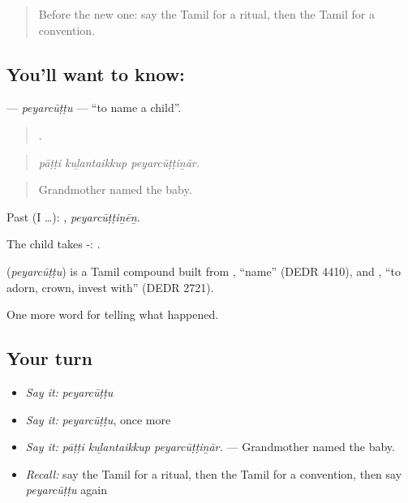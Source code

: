 \label{lesson:TA-C321-peyarcuttu}



\begin{quote}
Before the new one: say the Tamil for a ritual, then the Tamil for a convention.
\end{quote}

\subsection*{You'll want to know: }
\textbf{} — \emph{peyarcūṭṭu} — \textquotedblleft{}to name a child\textquotedblright{}.

\begin{quote}
  .
\end{quote}

\begin{quote}
\emph{pāṭṭi kuḻantaikkup peyarcūṭṭiṉār.}
\end{quote}

\begin{quote}
Grandmother named the baby.
\end{quote}

Past (I …): , \emph{peyarcūṭṭiṉēṉ}.

The child takes -:  .

\begin{cousinweb}
\textbf{} (\emph{peyarcūṭṭu}) is a Tamil compound built from , \textquotedblleft{}name\textquotedblright{} (DEDR 4410), and , \textquotedblleft{}to adorn, crown, invest with\textquotedblright{} (DEDR 2721).
\end{cousinweb}

\begin{grammarlens}[title={What you've built}]
One more word for telling what happened.
\end{grammarlens}

\subsection*{Your turn}
\begin{itemize}
\raggedright
  \item \emph{Say it:} \emph{peyarcūṭṭu}
  \item \emph{Say it:} \emph{peyarcūṭṭu}, once more
  \item \emph{Say it:} \emph{pāṭṭi kuḻantaikkup peyarcūṭṭiṉār.} — Grandmother named the baby.
  \item \emph{Recall:} say the Tamil for a ritual, then the Tamil for a convention, then say \emph{peyarcūṭṭu} again
\end{itemize}

